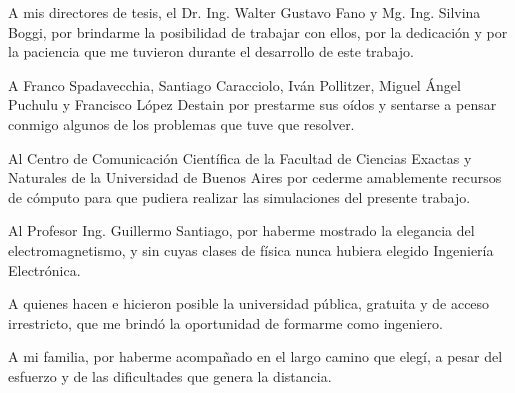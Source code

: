 A mis directores de tesis, el Dr. Ing. Walter Gustavo Fano y Mg. Ing. Silvina Boggi, por brindarme la posibilidad de trabajar con ellos, por la dedicación y por la paciencia que me tuvieron durante el desarrollo de este trabajo.

A Franco Spadavecchia, Santiago Caracciolo, Iván Pollitzer, Miguel Ángel Puchulu y Francisco López Destain por prestarme sus oídos y sentarse a pensar conmigo algunos de los problemas que tuve que resolver.

Al Centro de Comunicación Científica de la Facultad de Ciencias Exactas y Naturales de la Universidad de Buenos Aires por cederme amablemente recursos de cómputo para que pudiera realizar las simulaciones del presente trabajo.

Al Profesor Ing. Guillermo Santiago, por haberme mostrado la elegancia del electromagnetismo, y sin cuyas clases de física nunca hubiera elegido Ingeniería Electrónica.

A quienes hacen e hicieron posible la universidad pública, gratuita y de acceso irrestricto, que me brindó la oportunidad de formarme como ingeniero.

A mi familia, por haberme acompañado en el largo camino que elegí, a pesar del esfuerzo y de las dificultades que genera la distancia.